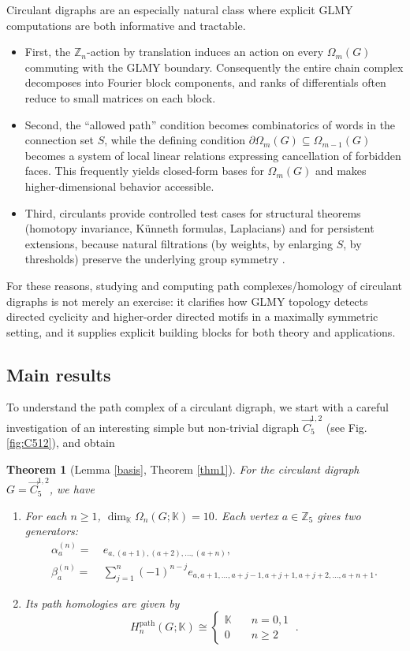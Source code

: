 \documentclass[11pt]{amsart}
\newcommand{\Z}{\mathbb Z}
\newcommand{\K}{\mathbb K}
\theoremstyle{plain}
\newtheorem{theorem}{Theorem}[section]
\theoremstyle{definition}
\numberwithin{equation}{section}
\begin{document}
\vskip 0.3cm
Circulant digraphs are an especially natural class where explicit GLMY computations are both informative and tractable. 
\begin{itemize}
    \item First, the $\mathbb{Z}_n$-action by translation induces an action on every $\Omega_m(G)$ commuting with the GLMY boundary. Consequently the entire chain complex decomposes into Fourier block components, and ranks of differentials often reduce to small matrices on each block. 
    \item Second, the ``allowed path'' condition becomes combinatorics of words in the connection set $S$, while the defining condition $\partial \Omega_m(G)\subseteq \Omega_{m-1}(G)$ becomes a system of local linear relations expressing cancellation of forbidden faces. This frequently yields closed-form bases for $\Omega_m(G)$ and makes higher-dimensional behavior accessible. 
    \item Third, circulants provide controlled test cases for structural theorems (homotopy invariance, K\"unneth formulas, Laplacians) and for persistent extensions, because natural filtrations (by weights, by enlarging $S$, by thresholds) preserve the underlying group symmetry \cite{ChowdhuryMemoli2017}. 
\end{itemize}

For these reasons, studying and computing path complexes/homology of circulant digraphs is not merely an exercise: it clarifies how GLMY topology detects directed cyclicity and higher-order directed motifs in a maximally symmetric setting, and it supplies explicit building blocks for both theory and applications.

\subsection{Main results}

To understand the path complex of a circulant digraph, we start with a careful investigation of an interesting simple but non-trivial digraph $\vec{C}_5^{1,2}$ (see Fig. \ref{fig:C512}), and obtain

\begin{theorem}[Lemma \ref{basis}, Theorem \ref{thm1}]
For the circulant digraph $G=\vec{C}_5^{1,2}$, we have
\begin{enumerate}
\setlength\itemsep{5pt}
\item For each $n\geq1$, $\dim_{\K}\Omega_n(G;\K)=10$. Each vertex $a\in\Z_5$ gives two generators:
\begin{align*}
\alpha_a^{(n)}=~&e_{a,(a+1),(a+2),\ldots,(a+n)},\\
\beta_a^{(n)}=~&\sum_{j=1}^n(-1)^{n-j}e_{a,a+1,\ldots,a+j-1,a+j+1,a+j+2,\ldots,a+n+1}.
\end{align*}
\item Its path homologies are given by
\[H_n^{\mathrm{path}}(G;\K)\cong\begin{cases}
\K &\quad n=0,1\\
0 &\quad n\geq2
\end{cases}~.\]
\end{enumerate}   
\end{theorem}
\end{document}
